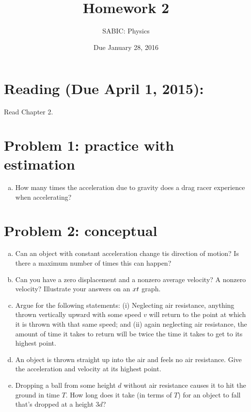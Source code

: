 \documentclass[10pt,letter]{article}
\begin{document}


\title{Homework 2}

\author{SABIC: Physics}

\date{Due January 28, 2016}
 
\maketitle 

\section*{Reading (Due April 1, 2015):}
Read Chapter 2.
\section*{Problem 1: practice with estimation}
\begin{enumerate}[(a)]
\item How many times the acceleration due to gravity does a drag racer experience when accelerating?
\end{enumerate}
\section*{Problem 2: conceptual}
\begin{enumerate}[(a)]
\item Can an object with constant acceleration change tis direction of motion? Is there a maximum number of times this can happen?
\item Can you have a zero displacement and a nonzero average velocity? A nonzero velocity? Illustrate your answers on an $x\-t$ graph.
\item Argue for the following statements: (i) Neglecting air resistance, anything thrown vertically upward with some speed $v$ will return to the point at which it is thrown with that same speed; and (ii) again neglecting air resistance, the amount of time it takes to return will be twice the time it takes to get to its highest point.
\item An object is thrown straight up into the air and feels no air resistance. Give the acceleration and velocity at its highest point.
\item Dropping a ball from some height $d$ without air resistance causes it to hit the ground in time $T$. How long does it take (in terms of $T$) for an object to fall that's dropped at a height $3d$?
\end{enumerate}
\end{document}
